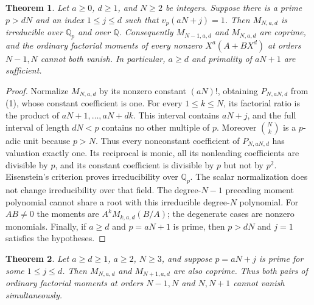 \documentclass[11pt]{article}
\newtheorem{theorem}{Theorem}
\begin{document}
\begin{theorem}\label{thm:nativeprime}
Let $a\ge0$, $d\ge1$, and $N\ge2$ be integers.
Suppose there is a prime $p>dN$ and an index $1\le j\le d$ such
that $v_p(aN+j)=1$.
Then $M_{N,a,d}$ is irreducible over $\mathbb Q_p$ and over
$\mathbb Q$. Consequently $M_{N-1,a,d}$ and $M_{N,a,d}$
are coprime, and the ordinary factorial moments of every nonzero
$X^a(A+BX^d)$ at orders $N-1,N$ cannot both vanish.
In particular, $a\ge d$ and primality of $aN+1$ are sufficient.
\end{theorem}
\begin{proof}
Normalize $M_{N,a,d}$ by its nonzero constant $(aN)!$, obtaining
$P_{N,aN,d}$ from (1), whose constant coefficient is one.
For every $1\le k\le N$, its factorial ratio is the product of
$aN+1,\ldots,aN+dk$. This interval contains $aN+j$, and the full
interval of length $dN<p$ contains no other multiple of $p$.
Moreover $\binom Nk$ is a $p$-adic unit because $p>N$.
Thus every nonconstant coefficient of $P_{N,aN,d}$ has valuation
exactly one. Its reciprocal is monic, all its nonleading
coefficients are divisible by $p$, and its constant coefficient
is divisible by $p$ but not by $p^2$.
Eisenstein's criterion proves irreducibility over $\mathbb Q_p$.
The scalar normalization does not change irreducibility over that
field. The degree-$N-1$ preceding moment polynomial cannot share
a root with this irreducible degree-$N$ polynomial.
For $AB\ne0$ the moments are $A^kM_{k,a,d}(B/A)$; the degenerate
cases are nonzero monomials.
Finally, if $a\ge d$ and $p=aN+1$ is prime, then
$p>dN$ and $j=1$ satisfies the hypotheses.
\end{proof}
\begin{theorem}\label{thm:forwardnative}
Let $a\ge d\ge1$, $a\ge2$, $N\ge3$, and suppose
$p=aN+j$ is prime for some $1\le j\le d$.
Then $M_{N,a,d}$ and $M_{N+1,a,d}$ are also coprime.
Thus both pairs of ordinary factorial moments at orders
$N-1,N$ and $N,N+1$ cannot vanish simultaneously.
\end{theorem}
\end{document}
